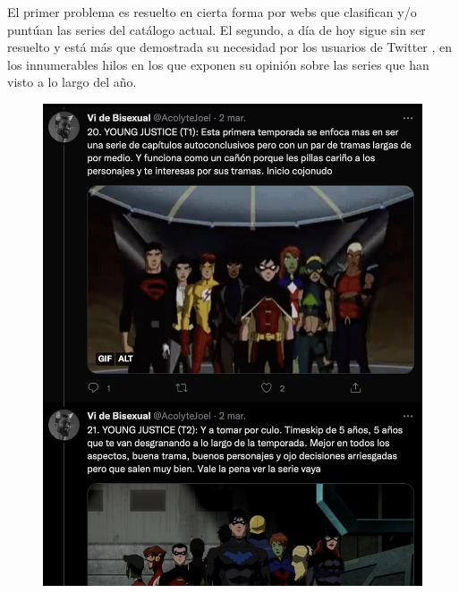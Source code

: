 El primer problema es resuelto en cierta forma por webs que clasifican y/o puntúan las series del catálogo actual. El segundo, a día de hoy sigue sin ser resuelto y está más que demostrada su necesidad por los usuarios de Twitter \cite{Twitter}, en los innumerables hilos en los que exponen su opinión sobre las series que han visto a lo largo del año.
\begin{figure}[H]
	\centering	
	\includegraphics[scale=0.25]{img/twitter-thread-1.png}

\end{figure}

